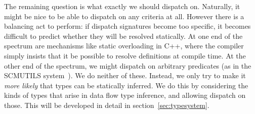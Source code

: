 




The remaining question is what exactly we should dispatch on.
Naturally, it might be nice to be able to dispatch on any criteria
at all.
However there is a balancing act to perform: if dispatch signatures
become too specific, it becomes difficult to predict whether they
will be resolved statically.
At one end of the spectrum are mechanisms like static overloading
in C++, where the compiler simply insists that it be possible to
resolve definitions at compile time.
At the other end of the spectrum, we might dispatch on arbitrary
predicates (as in the SCMUTILS system~\cite{Sussman:2001:SIC:375178}).
We do neither of these.
Instead, we only try to make it \emph{more likely} that types can be
statically inferred.
We do this by considering the kinds of types that arise in data flow
type inference, and allowing dispatch on those.
This will be developed in detail in section~\ref{sec:typesystem}.

